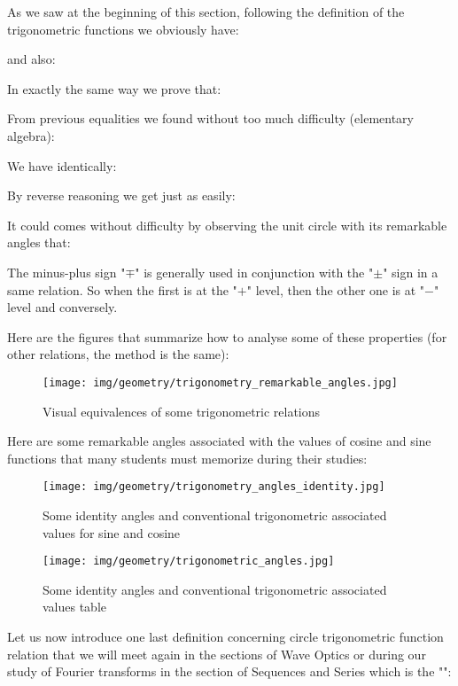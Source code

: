As we saw at the beginning of this section, following the definition of the trigonometric functions we obviously have:
	
	and also:
	
	In exactly the same way we prove that:
	
	From previous equalities we found without too much difficulty (elementary algebra):
	
	We have identically:
	
	By reverse reasoning we get just as easily:
	
	It could comes without difficulty by observing the unit circle with its remarkable angles that\label{remarkable angles}:
	
	\begin{tcolorbox}[title=Remark,colframe=black,arc=10pt]
	The minus-plus sign "$\mp$" is generally used in conjunction with the "$\pm$" sign in a same relation. So when the first is at the "$+$" level, then the other one is at "$-$" level and conversely.
	\end{tcolorbox}
	Here are the figures that summarize how to analyse some of these properties (for other relations, the method is the same):
	\begin{figure}[H]
		\centering
		\texttt{[image: img/geometry/trigonometry\_remarkable\_angles.jpg]}
		\caption{Visual equivalences of some trigonometric relations}
	\end{figure}
	Here are some remarkable angles associated with the values of cosine and sine functions that many students must memorize during their studies:
	\begin{figure}[H]
		\centering
		\texttt{[image: img/geometry/trigonometry\_angles\_identity.jpg]}
		\caption{Some identity angles and conventional trigonometric associated values for sine and cosine}
	\end{figure}

	\begin{figure}[H]
		\centering
		\texttt{[image: img/geometry/trigonometric\_angles.jpg]}
		\caption{Some identity angles and conventional trigonometric associated values table}
	\end{figure}
	Let us now introduce one last definition concerning circle trigonometric function relation that we will meet again in the sections of Wave Optics or during our study of Fourier transforms in the section of Sequences and Series which is the "\label{sinc cardinal}":
	
